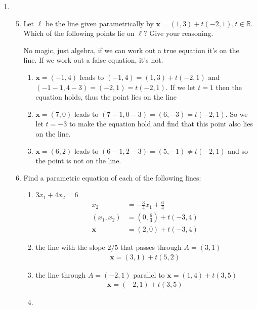\documentclass[letterpaper]{article}
\begin{document}
\renewcommand{\labelenumi}{1.\arabic{enumi}}
\renewcommand{\labelenumii}{\arabic{enumii}.}
\renewcommand{\labelenumiii}{(\alph{enumiii})}
\begin{enumerate}
\item
  \begin{enumerate}
  \setcounter{enumii}{4}
  \item
  Let $\ell$ be the line given parametrically by $\mathbf{x}=(1,3)+t(-2,1),t\in \mathbb{R}$. Which of the following points lie on $\ell$? Give your reasoning.

  No magic, just algebra, if we can work out a true equation it's on the line. If we work out a false equation, it's not.
    \begin{enumerate}
    \item
    $\mathbf{x}=(-1,4)$ leads to $(-1,4)=(1,3)+t(-2,1)$ and $(-1-1,4-3)=(-2,1)=t(-2,1)$. If we let $t=1$ then the equation holds, thus the point lies on the line
    \item
    $\mathbf{x}=(7,0)$ leads to $(7-1,0-3)=(6,-3)=t(-2,1)$. So we let $t=-3$ to make the equation hold and find that this point also lies on the line.
    \item
    $\mathbf{x}=(6,2)$ leads to $(6-1,2-3)=(5,-1)\ne t(-2,1)$ and so the point is not on the line.
    \end{enumerate}
  \item
  Find a parametric equation of each of the following lines:
    \begin{enumerate}
    \item
    $3x_1+4x_2=6$
    \begin{align*}
      x_2&=-\frac{3}{4}x_1+\frac{6}{4}\\
      (x_1,x_2)&=(0,\frac{6}{4})+t(-3,4)\\
      \mathbf{x}&=(2,0)+t(-3,4)
    \end{align*}
    \setcounter{enumiii}{2}
    \item
    the line with the slope $2/5$ that passes through $A=(3,1)$
    \begin{align*}
      \mathbf{x}=(3,1)+t(5,2)
    \end{align*}
    \item
    the line through $A=(-2,1)$ parallel to $\mathbf{x}=(1,4)+t(3,5)$
    \begin{align*}
      \mathbf{x}=(-2,1)+t(3,5)
    \end{align*}
    \setcounter{enumiii}{7}
    \item

\end{enumerate}
\end{enumerate}
\end{enumerate}
\end{document}
